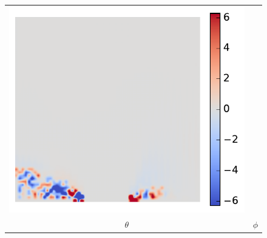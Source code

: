 \documentclass[11pt]{article}
\begin{document}
\begin{figure}[!h]
\begin{tabular}{cc}
         \includegraphics[scale=.5]{img/asymmetricFlux/phi.pdf}
         \\
         $\theta $ & $\phi$ 
    \end{tabular}
\end{figure}
\pagebreak
\end{document}

